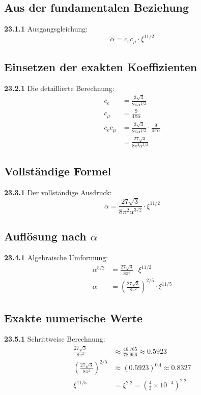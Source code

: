 \subsection{Aus der fundamentalen Beziehung}
\noindent \textbf{23.1.1} Ausgangsgleichung:
\begin{equation}
	\alpha = c_e c_\mu \cdot \xi^{11/2}
\end{equation}

\subsection{Einsetzen der exakten Koeffizienten}
\noindent \textbf{23.2.1} Die detaillierte Berechnung:
\begin{align}
	c_e &= \frac{3\sqrt{3}}{2\pi\alpha^{1/2}} \\
	c_\mu &= \frac{9}{4\pi\alpha} \\
	c_e c_\mu &= \frac{3\sqrt{3}}{2\pi\alpha^{1/2}} \cdot \frac{9}{4\pi\alpha} \\
	&= \frac{27\sqrt{3}}{8\pi^2\alpha^{3/2}}
\end{align}

\subsection{Vollständige Formel}
\noindent \textbf{23.3.1} Der vollständige Ausdruck:
\begin{equation}
	\alpha = \frac{27\sqrt{3}}{8\pi^2\alpha^{3/2}} \cdot \xi^{11/2}
\end{equation}

\subsection{Auflösung nach $\alpha$}
\noindent \textbf{23.4.1} Algebraische Umformung:
\begin{align}
	\alpha^{5/2} &= \frac{27\sqrt{3}}{8\pi^2} \cdot \xi^{11/2} \\
	\alpha &= \left(\frac{27\sqrt{3}}{8\pi^2}\right)^{2/5} \cdot \xi^{11/5}
\end{align}

\subsection{Exakte numerische Werte}
\noindent \textbf{23.5.1} Schrittweise Berechnung:
\begin{align}
	\frac{27\sqrt{3}}{8\pi^2} &\approx \frac{46.765}{78.956} \approx 0.5923 \\
	\left(\frac{27\sqrt{3}}{8\pi^2}\right)^{2/5} &\approx (0.5923)^{0.4} \approx 0.8327 \\
	\xi^{11/5} &= \xi^{2.2} = \left(\frac{4}{3} \times 10^{-4}\right)^{2.2}
\end{align}

